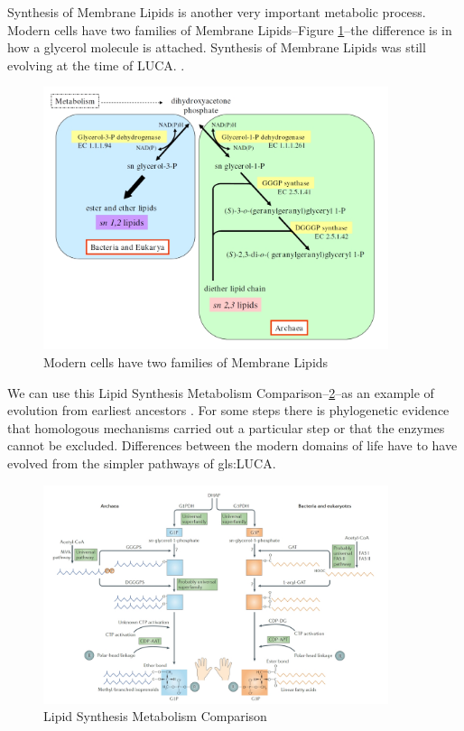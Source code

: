 \documentclass[]{article}
\begin{document}
Synthesis of Membrane Lipids is another very important metabolic process. Modern cells have two families of Membrane Lipids--Figure \ref{fig:SynthsisMembraneLipids}--the difference is in how a glycerol molecule is attached. Synthesis of Membrane Lipids was still evolving at the time of LUCA. \cite{glansdorff2008last}.
\begin{figure}[H]
	\caption{Modern cells have two families of Membrane Lipids} \label{fig:SynthsisMembraneLipids} 
	\includegraphics[width=0.9\textwidth]{SynthsisMembraneLipids}
\end{figure}

We can use this Lipid Synthesis Metabolism Comparison--\ref {fig:LipidSynthesisComparison}--as an example of evolution from earliest ancestors \cite{lombard2012early}. For some steps there is phylogenetic evidence that homologous mechanisms carried out a particular step or that the enzymes cannot be excluded. Differences between the modern domains of life have to have evolved from the simpler pathways of \gls{gls:LUCA}.
\begin{figure}[H]
	\caption{Lipid Synthesis Metabolism Comparison} \label{fig:LipidSynthesisComparison} 
	\includegraphics[width=0.9\textwidth]{LipidSynthesisComparison}
\end{figure}
\end{document}
